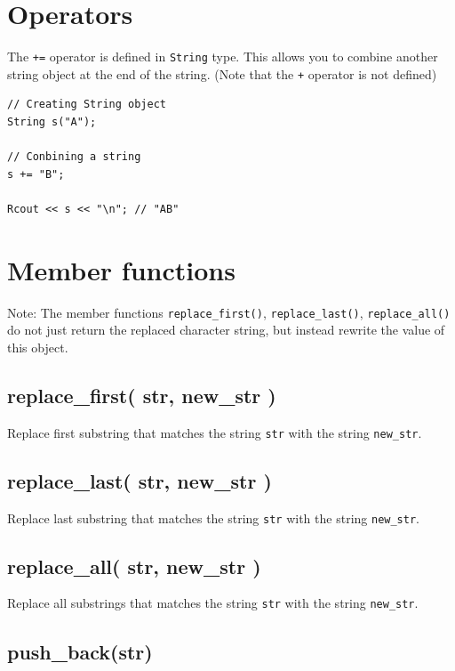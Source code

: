 \documentclass[]{book}
\theoremstyle{definition}
\theoremstyle{definition}
\theoremstyle{remark}
\begin{document}
\section{Operators}\label{operators}

The \texttt{+=} operator is defined in \texttt{String} type. This allows
you to combine another string object at the end of the string. (Note
that the \texttt{+} operator is not defined)

\begin{verbatim}
// Creating String object
String s("A");

// Conbining a string
s += "B";

Rcout << s << "\n"; // "AB"
\end{verbatim}

\section{Member functions}\label{member-functions-4}

Note: The member functions \texttt{replace\_first()},
\texttt{replace\_last()}, \texttt{replace\_all()} do not just return the
replaced character string, but instead rewrite the value of this object.

\subsection{replace\_first( str, new\_str
)}\label{replace_first-str-new_str}

Replace first substring that matches the string \texttt{str} with the
string \texttt{new\_str}.

\subsection{replace\_last( str, new\_str
)}\label{replace_last-str-new_str}

Replace last substring that matches the string \texttt{str} with the
string \texttt{new\_str}.

\subsection{replace\_all( str, new\_str
)}\label{replace_all-str-new_str}

Replace all substrings that matches the string \texttt{str} with the
string \texttt{new\_str}.

\subsection{push\_back(str)}\label{push_backstr}
\end{document}
